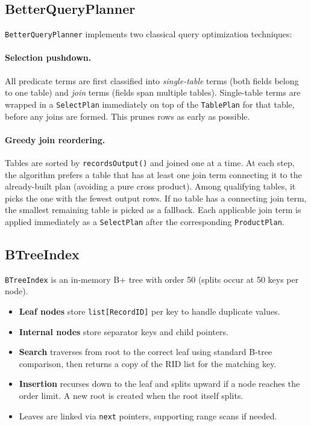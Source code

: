 \documentclass[12pt,a4paper]{article}
\begin{document}
\subsection{BetterQueryPlanner}

\texttt{BetterQueryPlanner} implements two classical query optimization techniques:

\paragraph{Selection pushdown.}
All predicate terms are first classified into \emph{single-table} terms (both fields belong to one table) and \emph{join} terms (fields span multiple tables). Single-table terms are wrapped in a \texttt{SelectPlan} immediately on top of the \texttt{TablePlan} for that table, before any joins are formed. This prunes rows as early as possible.

\paragraph{Greedy join reordering.}
Tables are sorted by \texttt{recordsOutput()} and joined one at a time. At each step, the algorithm prefers a table that has at least one join term connecting it to the already-built plan (avoiding a pure cross product). Among qualifying tables, it picks the one with the fewest output rows. If no table has a connecting join term, the smallest remaining table is picked as a fallback. Each applicable join term is applied immediately as a \texttt{SelectPlan} after the corresponding \texttt{ProductPlan}.

\subsection{BTreeIndex}

\texttt{BTreeIndex} is an in-memory B+ tree with order 50 (splits occur at 50 keys per node).

\begin{itemize}[nosep]
  \item \textbf{Leaf nodes} store \texttt{list[RecordID]} per key to handle duplicate values.
  \item \textbf{Internal nodes} store separator keys and child pointers.
  \item \textbf{Search} traverses from root to the correct leaf using standard B-tree comparison, then returns a copy of the RID list for the matching key.
  \item \textbf{Insertion} recurses down to the leaf and splits upward if a node reaches the order limit. A new root is created when the root itself splits.
  \item Leaves are linked via \texttt{next} pointers, supporting range scans if needed.
\end{itemize}
\end{document}
